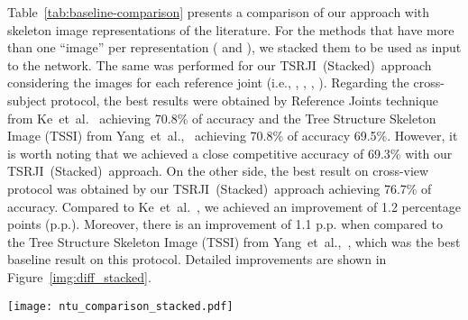 \documentclass[10pt,conference]{IEEEtran}
\def\sigla{TSRJI}
\begin{document}
Table~\ref{tab:baseline-comparison} presents a comparison of our approach with skeleton image representations of the literature. For the methods that have more than one ``image'' per representation (\cite{Wang:2016} and \cite{Ke:2017}), we stacked them to be used as input to the network. The same was performed for our \sigla~(Stacked)~approach considering the images for each reference joint (i.e., , , , ). Regarding the cross-subject protocol, the best results were obtained by Reference Joints technique from Ke~et~al.~\cite{Ke:2017} achieving 70.8\% of accuracy and the Tree Structure Skeleton Image (TSSI) from Yang~et~al.,~\cite{Yang:2018} achieving 70.8\% of accuracy 69.5\%. However, it is worth noting that we achieved a close competitive accuracy of 69.3\% with our \sigla~(Stacked)~approach. On the other side, the best result on cross-view protocol was obtained by our \sigla~(Stacked)~approach achieving 76.7\% of accuracy. Compared to Ke~et~al.~\cite{Ke:2017}, we achieved an improvement of 1.2 percentage points (p.p.). Moreover, there is an improvement of 1.1 p.p. when compared to the Tree Structure Skeleton Image (TSSI) from Yang~et~al.,~\cite{Yang:2018}, which was the best baseline result on this protocol. Detailed improvements are shown in Figure~\ref{img:diff_stacked}.

\begin{figure*}[!htb]
\centering
	\texttt{[image: ntu\_comparison\_stacked.pdf]}
	\caption{Comparison of \sigla~(Stacked) with Ke et al.~\cite{Ke:2017} and Yang et al.~\cite{Yang:2018} on NTU RGB+D~60~\cite{Shahroudy:2016} dataset for cross-view protocol. Best viewed in color.}
	\label{img:diff_stacked}
\end{figure*}
\end{document}
